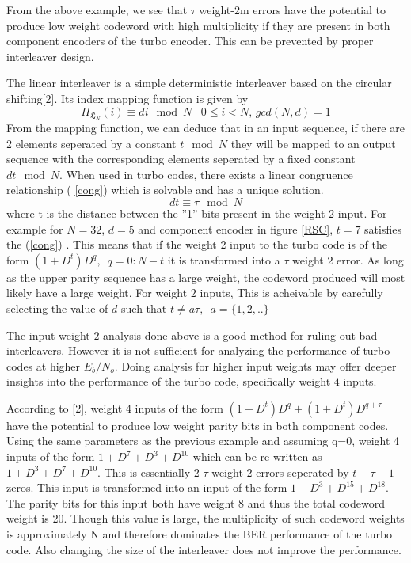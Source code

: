 \documentclass[twocolumn]{article}
\begin{document}
 From the above example, we see that $\tau$ weight-2m errors have the potential to
produce low weight codeword with high multiplicity if they are present in both 
component encoders of the turbo encoder. This can be prevented by proper interleaver
 design.
 
The linear interleaver is a simple deterministic interleaver based on the circular shifting[2].
Its index mapping function is given by 
\begin{equation}
 \Pi_{\mathfrak{L}_N}(i) \equiv di \mod N \,\,\,\,\, 0 \leq i < N, \, gcd(N,d)=1
\end{equation}
From the mapping function, we can deduce that in an input sequence,
if there are 2 elements seperated by
a constant $t\mod N$ they will be mapped to an output sequence with the corresponding
elements seperated by a fixed constant $dt \mod N$. When used in turbo codes, there
exists a linear congruence relationship ( \ref{cong}) 
which is solvable and has a unique solution.
 \begin{equation} 
 dt \equiv \tau \mod N
 \label{cong}
 \end{equation}
where t is the distance between the ''1'' bits present in the weight-2 input.
For example for $N=32$, $d=5$ and component encoder in figure \ref{RSC}, 
$t=7$ satisfies the (\ref{cong}) . This means
that if the weight 2 input to the turbo code is of the form $(1+D^t)D^q,
\,\,\, q=0:N-t$ it is transformed
into a $\tau$ weight $2$ error. As long as the upper parity sequence has a large weight,
the codeword produced will most likely have a large weight. For weight $2$ inputs,
This is acheivable by 
carefully selecting the value of $d$ such that $t\neq a\tau,\,\,\, a=\{1,2,..\}$

The input weight $2$ analysis done above is a good method for ruling out bad interleavers.
However it is not sufficient for analyzing the performance of turbo codes at higher
$E_b/ N_o$. Doing analysis for higher input weights may offer deeper insights into
the performance of the turbo code, specifically weight $4$ inputs.

According to [2], weight 4 inputs of the form $(1+D^t)D^q+(1+D^t)D^{q+\tau}$
have the potential to produce low weight parity bits in both component codes. Using the 
same parameters as the previous example and assuming q=0, weight 4 inputs of the
form $1+D^7+D^3 +D^10$ which can be re-written as $1+D^3+D^7 +D^10$.
This is essentially 2 $\tau$ weight $2$ errors seperated by $t-\tau -1$ zeros. This input
is transformed into an input of the form $1+D^3+D^{15}+D^{18}$. The parity
bits for this input both have weight 8 and thus the total codeword weight is 20.
Though this value is large, the multiplicity of such codeword weights is approximately
N and therefore dominates the BER performance of the turbo code. Also changing the
size of the interleaver does not improve the performance.
\end{document}
